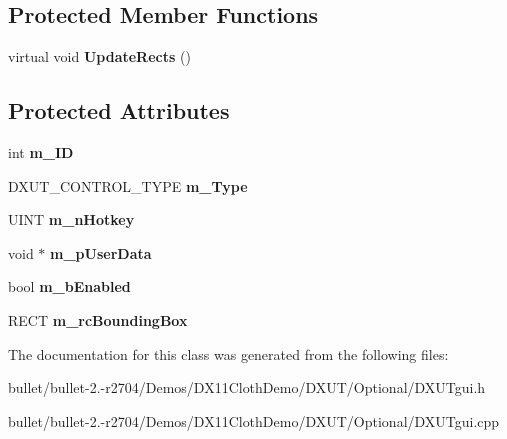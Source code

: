 \subsection*{Protected Member Functions}
\begin{DoxyCompactItemize}
\item 
\hypertarget{class_c_d_x_u_t_control_a5fb3a79178c678abaa0da57566a09002}{virtual void {\bfseries Update\+Rects} ()}\label{class_c_d_x_u_t_control_a5fb3a79178c678abaa0da57566a09002}

\end{DoxyCompactItemize}
\subsection*{Protected Attributes}
\begin{DoxyCompactItemize}
\item 
\hypertarget{class_c_d_x_u_t_control_a4388cb300910f7f8feb339e05a8caace}{int {\bfseries m\+\_\+\+I\+D}}\label{class_c_d_x_u_t_control_a4388cb300910f7f8feb339e05a8caace}

\item 
\hypertarget{class_c_d_x_u_t_control_a7129785fc87a2609fe37f75510193945}{D\+X\+U\+T\+\_\+\+C\+O\+N\+T\+R\+O\+L\+\_\+\+T\+Y\+P\+E {\bfseries m\+\_\+\+Type}}\label{class_c_d_x_u_t_control_a7129785fc87a2609fe37f75510193945}

\item 
\hypertarget{class_c_d_x_u_t_control_a0acdf7fe9bc8465ec53ea1a90346cd9b}{U\+I\+N\+T {\bfseries m\+\_\+n\+Hotkey}}\label{class_c_d_x_u_t_control_a0acdf7fe9bc8465ec53ea1a90346cd9b}

\item 
\hypertarget{class_c_d_x_u_t_control_a433792bb8edbdbb3c3ea2e8bf94601cb}{void $\ast$ {\bfseries m\+\_\+p\+User\+Data}}\label{class_c_d_x_u_t_control_a433792bb8edbdbb3c3ea2e8bf94601cb}

\item 
\hypertarget{class_c_d_x_u_t_control_ae05508ff37757e6fcc59288f4ee08a13}{bool {\bfseries m\+\_\+b\+Enabled}}\label{class_c_d_x_u_t_control_ae05508ff37757e6fcc59288f4ee08a13}

\item 
\hypertarget{class_c_d_x_u_t_control_a79a42b50b16258d25085b298d0033800}{R\+E\+C\+T {\bfseries m\+\_\+rc\+Bounding\+Box}}\label{class_c_d_x_u_t_control_a79a42b50b16258d25085b298d0033800}

\end{DoxyCompactItemize}


The documentation for this class was generated from the following files\+:\begin{DoxyCompactItemize}
\item 
bullet/bullet-\/2.-\/r2704/\+Demos/\+D\+X11\+Cloth\+Demo/\+D\+X\+U\+T/\+Optional/D\+X\+U\+Tgui.\+h\item 
bullet/bullet-\/2.-\/r2704/\+Demos/\+D\+X11\+Cloth\+Demo/\+D\+X\+U\+T/\+Optional/D\+X\+U\+Tgui.\+cpp\end{DoxyCompactItemize}
